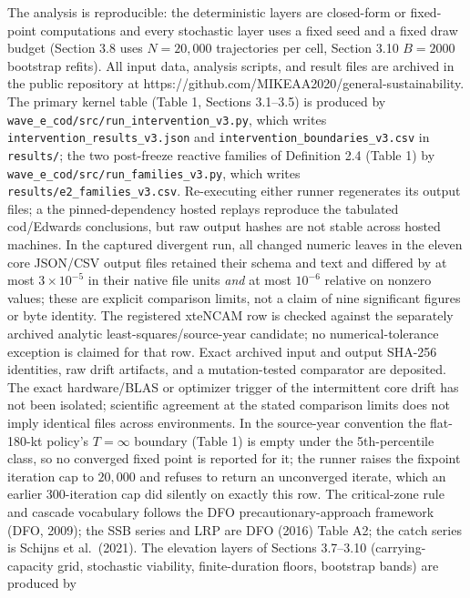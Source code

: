 The analysis is reproducible: the deterministic layers are closed-form or
fixed-point computations and every stochastic layer uses a fixed seed and a
fixed draw budget (Section 3.8 uses \(N = 20{,}000\) trajectories per cell,
Section 3.10 \(B = 2000\) bootstrap refits). All input data, analysis
scripts, and result files are archived in the public repository at
https://github.com/MIKEAA2020/general-sustainability. The primary kernel
table (Table 1, Sections 3.1--3.5) is produced by
\texttt{wave\_e\_cod/src/run\_intervention\_v3.py}, which writes
\texttt{intervention\_results\_v3.json} and
\texttt{intervention\_boundaries\_v3.csv} in \texttt{results/}; the two post-freeze
reactive families of Definition 2.4 (Table 1) by
\texttt{wave\_e\_cod/src/\allowbreak{}run\_families\_v3.py}, which
writes
\texttt{results/e2\_families\_v3.csv}. Re-executing either runner
regenerates its output files; a
the pinned-dependency hosted replays reproduce the tabulated cod/Edwards
conclusions, but raw output hashes are not stable across hosted machines.
In the captured divergent run, all changed numeric leaves in the eleven core
JSON/CSV output files retained their schema and text and differed by at most
\(3\times10^{-5}\) in their native file units \emph{and} at most
\(10^{-6}\) relative on nonzero values; these are explicit comparison
limits, not a claim of nine significant figures or byte identity. The
registered xteNCAM row is checked against the separately archived analytic
least-squares/source-year candidate; no numerical-tolerance exception is
claimed for that row. Exact archived input and output SHA-256 identities,
raw drift artifacts, and a mutation-tested comparator are deposited.
The exact hardware/BLAS or optimizer trigger of the intermittent core drift
has not been isolated; scientific agreement at the stated comparison limits
does not imply identical files across environments. In the source-year convention the flat-180-kt policy's
\(T=\infty\) boundary (Table 1) is empty under the 5th-percentile class,
so no converged fixed point is reported for it; the runner raises the
fixpoint iteration cap to \(20{,}000\) and refuses to return an
unconverged iterate, which an earlier \(300\)-iteration cap did silently
on exactly this row. The critical-zone
rule and cascade vocabulary follows the DFO precautionary-approach
framework (DFO, 2009); the SSB series and LRP are DFO (2016) Table A2;
the catch series is Schijns et al.~(2021). The elevation layers of
Sections 3.7--3.10 (carrying-capacity grid, stochastic viability,
finite-duration floors, bootstrap bands) are produced by

